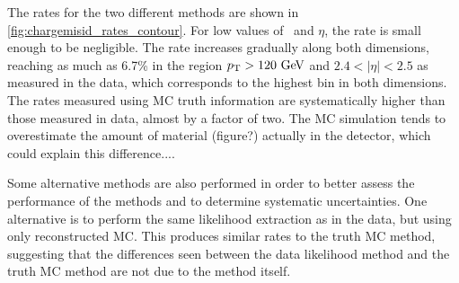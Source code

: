 The rates for the two different methods are 
shown in \fig\ref{fig:chargemisid_rates_contour}.
For low values of \pt~and $\eta$, the rate is small enough to be negligible. 
The rate increases gradually along both dimensions, reaching as much as
6.7\% in the region $\pt > 120\GeV$ and $2.4 < |\eta| < 2.5$ as measured
in the data, which corresponds to the highest bin in both dimensions. 
The rates measured using MC truth information are systematically higher
than those measured in data, almost by a factor of two. The MC simulation
tends to overestimate the amount of material (figure?) actually in the
detector, which could explain this difference....





Some alternative methods are also performed
in order to better assess the performance of the methods
and to determine systematic uncertainties.
One alternative is to perform the same likelihood extraction
as in the data, but using only reconstructed MC. This produces
similar rates to the truth MC method, suggesting that the differences
seen between the data likelihood method and the truth MC method
are not due to the method itself. 

